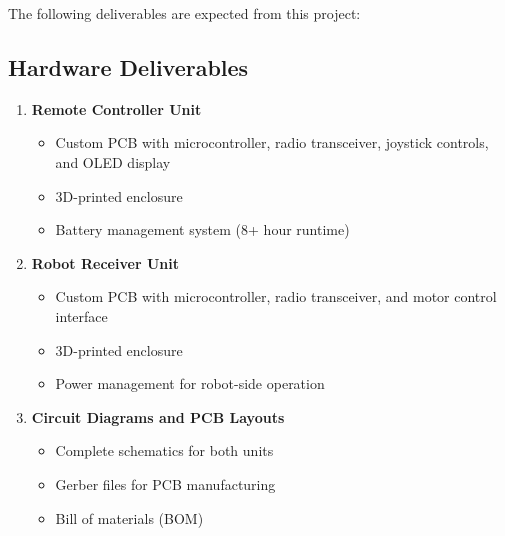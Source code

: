 The following deliverables are expected from this project:

\subsection*{Hardware Deliverables}
\begin{enumerate}
    \item \textbf{Remote Controller Unit}
    \begin{itemize}
        \item Custom PCB with microcontroller, radio transceiver, joystick controls, and OLED display
        \item 3D-printed enclosure
        \item Battery management system (8+ hour runtime)
    \end{itemize}
    
    \item \textbf{Robot Receiver Unit}
    \begin{itemize}
        \item Custom PCB with microcontroller, radio transceiver, and motor control interface
        \item 3D-printed enclosure
        \item Power management for robot-side operation
    \end{itemize}
    
    \item \textbf{Circuit Diagrams and PCB Layouts}
    \begin{itemize}
        \item Complete schematics for both units
        \item Gerber files for PCB manufacturing
        \item Bill of materials (BOM)
    \end{itemize}
\end{enumerate}

